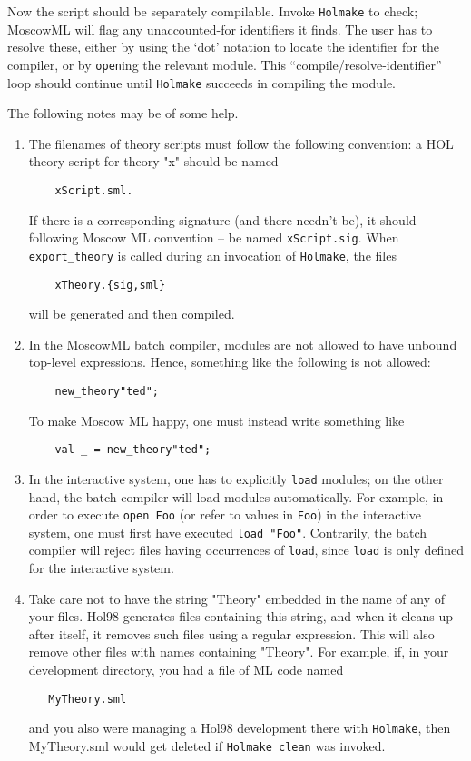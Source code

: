 Now the script should be separately compilable. Invoke {\tt Holmake} to check;
MoscowML will flag any unaccounted-for identifiers it finds. The user
has to resolve these, either by using the `dot' notation to locate the
identifier for the compiler, or by \verb+open+ing the relevant
module. This ``compile/resolve-identifier'' loop should continue until
{\tt Holmake} succeeds in compiling the module.

The following notes may be of some help.

\begin{enumerate}
\item The filenames of theory scripts must follow the following
convention: a HOL theory script for theory "x" should be 
named
\begin{verbatim}
    xScript.sml. 
\end{verbatim}
If there is a corresponding signature (and there needn't be), it
should -- following Moscow ML convention -- be named \verb+xScript.sig+. When
\verb+export_theory+ is called during an invocation of \verb+Holmake+,
the files  
\begin{verbatim}
    xTheory.{sig,sml}
\end{verbatim}
will be generated and then compiled.

\item In the MoscowML batch compiler, modules are not allowed to have unbound
top-level expressions. Hence, something like the following is not
allowed:
\begin{verbatim}
    new_theory"ted";
\end{verbatim}
To make Moscow ML happy, one must instead write something like
\begin{verbatim}
    val _ = new_theory"ted";
\end{verbatim}


\item In the interactive system, one has to explicitly \verb+load+
modules; on the other hand, the batch compiler will load modules
automatically.  For example, in order to execute \verb+open Foo+ (or
refer to values in \verb+Foo+) in the interactive system, one must first
have executed \verb+load "Foo"+. Contrarily, the batch compiler will reject
files having occurrences of \verb+load+, since \verb+load+ is only
defined for the interactive system.

\item Take care not to have the string "Theory" embedded in the name of any of
your files. Hol98 generates files containing this string, and when it
cleans up after itself, it removes such files using a regular
expression. This will also remove other files with names containing
"Theory". For example, if, in your development directory, you had a file
of ML code named
\begin{verbatim}
   MyTheory.sml
\end{verbatim}
and you also were managing a Hol98 development there with {\tt Holmake}, then
MyTheory.sml would get deleted if \verb+Holmake clean+ was invoked.



\end{enumerate}
